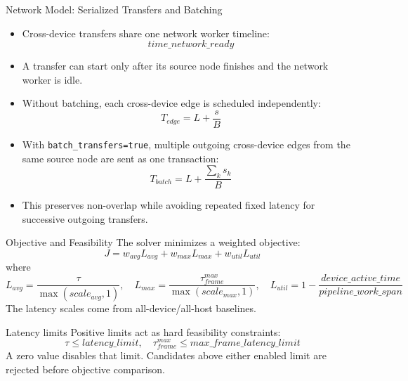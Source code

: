 \documentclass[aspectratio=169]{beamer}
\begin{document}
\begin{frame}{Network Model: Serialized Transfers and Batching}
  \begin{itemize}
    \item Cross-device transfers share one network worker timeline:
      \[
        time\_network\_ready
      \]
    \item A transfer can start only after its source node finishes and the network worker is idle.
    \item Without batching, each cross-device edge is scheduled independently:
      \[
        T_{edge}=L+\frac{s}{B}
      \]
    \item With \texttt{batch\_transfers=true}, multiple outgoing cross-device edges from the same source node are sent as one transaction:
      \[
        T_{batch}=L+\frac{\sum_k s_k}{B}
      \]
    \item This preserves non-overlap while avoiding repeated fixed latency for successive outgoing transfers.
  \end{itemize}
\end{frame}

\begin{frame}{Objective and Feasibility}
  The solver minimizes a weighted objective:
  \[
    J =
    w_{avg} L_{avg}
    + w_{max} L_{max}
    + w_{util} L_{util}
  \]
  where
  \[
    L_{avg}=\frac{\tau}{\max(scale_{avg}, 1)},\quad
    L_{max}=\frac{\tau_{frame}^{max}}{\max(scale_{max}, 1)},\quad
    L_{util}=1-\frac{device\_active\_time}{pipeline\_work\_span}
  \]
  The latency scales come from all-device/all-host baselines.
  \vspace{0.5em}
  \begin{block}{Latency limits}
    Positive limits act as hard feasibility constraints:
    \[
      \tau \leq latency\_limit,\quad
      \tau_{frame}^{max} \leq max\_frame\_latency\_limit
    \]
    A zero value disables that limit. Candidates above either enabled limit are rejected before objective comparison.
  \end{block}
\end{frame}
\end{document}
